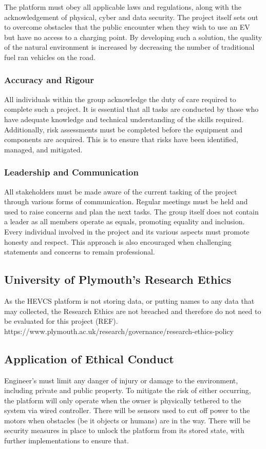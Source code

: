 \documentclass [12pt]{article}
\begin{document}
The platform must obey all applicable laws and regulations, along with the acknowledgement of physical, cyber and data security. The project itself sets out to overcome obstacles that the public encounter when they wish to use an EV but have no access to a charging point. By developing such a solution, the quality of the natural environment is increased by decreasing the number of traditional fuel ran vehicles on the road.

\subsubsection{Accuracy and Rigour}

All individuals within the group acknowledge the duty of care required to complete such a project. It is essential that all tasks are conducted by those who have adequate knowledge and technical understanding of the skills required. Additionally, risk assessments must be completed before the equipment and components are acquired. This is to ensure that risks have been identified, managed, and mitigated.

\subsubsection{Leadership and Communication}

All stakeholders must be made aware of the current tasking of the project through various forms of communication. Regular meetings must be held and used to raise concerns and plan the next tasks. The group itself does not contain a leader as all members operate as equals, promoting equality and inclusion. Every individual involved in the project and its various aspects must promote honesty and respect. This approach is also encouraged when challenging statements and concerns to remain professional.


\subsection{University of Plymouth's Research Ethics}

As the HEVCS platform is not storing data, or putting names to any data that may collected, the Research Ethics are not breached and therefore do not need to be evaluated for this project (REF).
https://www.plymouth.ac.uk/research/governance/research-ethics-policy

\subsection{Application of Ethical Conduct}
Engineer’s must limit any danger of injury or damage to the environment, including private and public property. To mitigate the risk of either occurring, the platform will only operate when the owner is physically tethered to the system via wired controller. There will be sensors used to cut off power to the motors when obstacles (be it objects or humans) are in the way. There will be security measures in place to unlock the platform from its stored state, with further implementations to ensure that.
\end{document}
